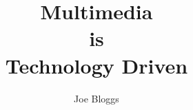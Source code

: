 \documentclass[MSCIM]{mscim}
\begin{document}

\title{Multimedia \\ is \\ Technology Driven}
\author{Joe Bloggs}




\printbibliography
\end{document}

